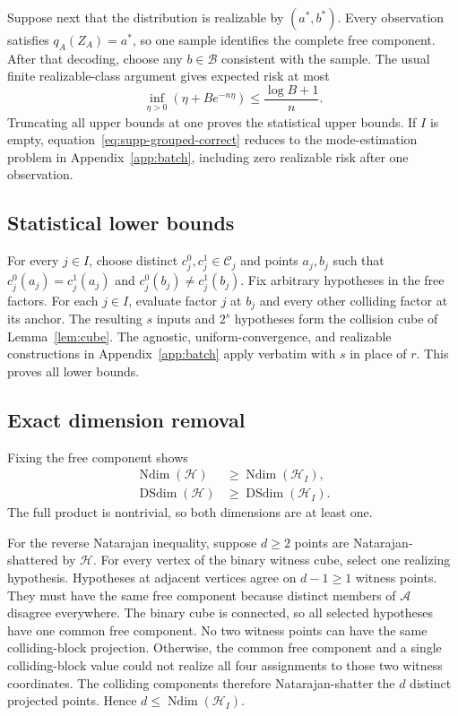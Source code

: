 \documentclass[twoside]{article}
\newcommand{\C}{\mathcal C}
\newcommand{\Ndim}{\operatorname{Ndim}}
\newcommand{\DSdim}{\operatorname{DSdim}}
\begin{document}
Suppose next that the distribution is realizable by $(a^*,b^*)$. Every observation satisfies $q_A(Z_A)=a^*$, so one sample identifies the complete free component. After that decoding, choose any $b\in\mathcal B$ consistent with the sample. The usual finite realizable-class argument gives expected risk at most
\[
 \inf_{\eta>0}\left(\eta+B e^{-n\eta}\right)
 \leq \frac{\log B+1}{n}.
\]
Truncating all upper bounds at one proves the statistical upper bounds. If $I$ is empty, equation~\eqref{eq:supp-grouped-correct} reduces to the mode-estimation problem in Appendix~\ref{app:batch}, including zero realizable risk after one observation.

\subsection{Statistical lower bounds}

For every $j\in I$, choose distinct $c_j^0,c_j^1\in\C_j$ and points $a_j,b_j$ such that $c_j^0(a_j)=c_j^1(a_j)$ and $c_j^0(b_j)\neq c_j^1(b_j)$. Fix arbitrary hypotheses in the free factors. For each $j\in I$, evaluate factor $j$ at $b_j$ and every other colliding factor at its anchor. The resulting $s$ inputs and $2^s$ hypotheses form the collision cube of Lemma~\ref{lem:cube}. The agnostic, uniform-convergence, and realizable constructions in Appendix~\ref{app:batch} apply verbatim with $s$ in place of $r$. This proves all lower bounds.

\subsection{Exact dimension removal}

Fixing the free component shows
\begin{align*}
 \Ndim(\mathcal H)&\geq\Ndim(\mathcal H_I),\\
 \DSdim(\mathcal H)&\geq\DSdim(\mathcal H_I).
\end{align*}
The full product is nontrivial, so both dimensions are at least one.

For the reverse Natarajan inequality, suppose $d\geq2$ points are Natarajan-shattered by $\mathcal H$. For every vertex of the binary witness cube, select one realizing hypothesis. Hypotheses at adjacent vertices agree on $d-1\geq1$ witness points. They must have the same free component because distinct members of $\mathcal A$ disagree everywhere. The binary cube is connected, so all selected hypotheses have one common free component. No two witness points can have the same colliding-block projection. Otherwise, the common free component and a single colliding-block value could not realize all four assignments to those two witness coordinates. The colliding components therefore Natarajan-shatter the $d$ distinct projected points. Hence $d\leq\Ndim(\mathcal H_I)$.
\end{document}
